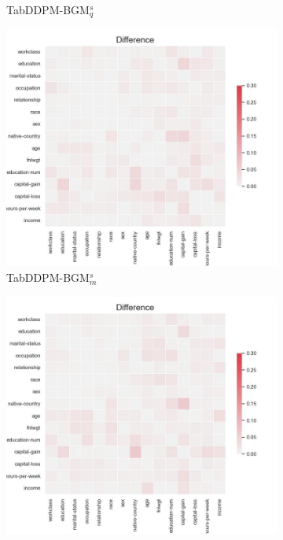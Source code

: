 \begin{figure}[h]
\begin{subfigure}{0.3\textwidth}
		\caption{TabDDPM-BGM$^{s}_q$}
	\end{subfigure}
    \begin{subfigure}{0.3\textwidth}
        \includegraphics[width=\textwidth]{images/correlation_difference/tab-ddpm-bgm-simTune-minmax.jpg}
        \caption{TabDDPM-BGM$^{s}_m$}
    \end{subfigure}
	\begin{subfigure}{0.3\textwidth}
        \includegraphics[width=\textwidth]{images/correlation_difference/tab-ddpm-bgm-simTune-none.jpg}

\end{subfigure}
\end{figure}
